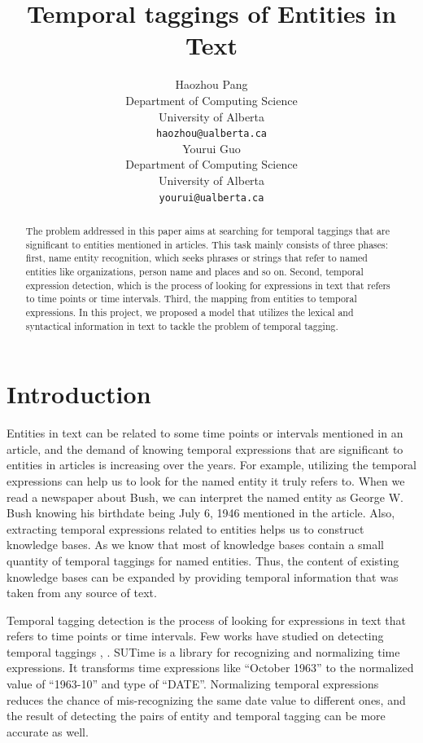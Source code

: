 \documentclass[12pt,a4paper]{article}
\title{Temporal taggings of Entities in Text }
\author{Haozhou Pang \\
  Department of Computing Science \\
  University of Alberta\\
  {\tt haozhou@ualberta.ca} \\\And
 Yourui Guo\\
  Department of Computing Science \\
  University of Alberta\\
  {\tt yourui@ualberta.ca} \\}
\date{}
\begin{document}
\maketitle

\begin{abstract}
The problem addressed in this paper aims at searching for temporal taggings that are significant to entities mentioned in articles. This task mainly consists of three phases: first, name entity recognition, which seeks phrases or strings that refer to named entities like organizations, person name and places and so on. Second, temporal expression detection, which is the process of looking for expressions in text that refers to time points or time intervals. Third, the mapping from entities to temporal expressions. In this project, we proposed a model that utilizes the lexical and syntactical information in text to tackle the problem of temporal tagging.

\end{abstract}


\section{Introduction}
 
Entities in text can be related to some time points or intervals mentioned in an article, and the demand of knowing temporal expressions that are significant to entities in articles is increasing over the years. For example, utilizing the temporal expressions can help us to look for the named entity it truly refers to. When we read a newspaper about Bush, we can interpret the named entity as George W. Bush knowing his birthdate being July 6, 1946 mentioned in the article. Also, extracting temporal expressions related to entities helps us to construct knowledge bases. As we know that most of knowledge bases contain a small quantity of temporal taggings for named entities. Thus, the content of existing knowledge bases can be expanded by providing temporal information that was taken from any source of text.

Temporal tagging detection is the process of looking for expressions in text that refers to time points or time intervals. Few works have studied on detecting temporal taggings \cite{SuTime}, \cite{HeidelTime}. SUTime \cite{SuTime} is a library for recognizing and normalizing time expressions. It transforms time expressions like “October 1963” to the normalized value of “1963-10” and type of “DATE”. Normalizing temporal expressions reduces the chance of mis-recognizing the same date value to different ones, and the result of detecting the pairs of entity and temporal tagging can be more accurate as well.
\end{document}

